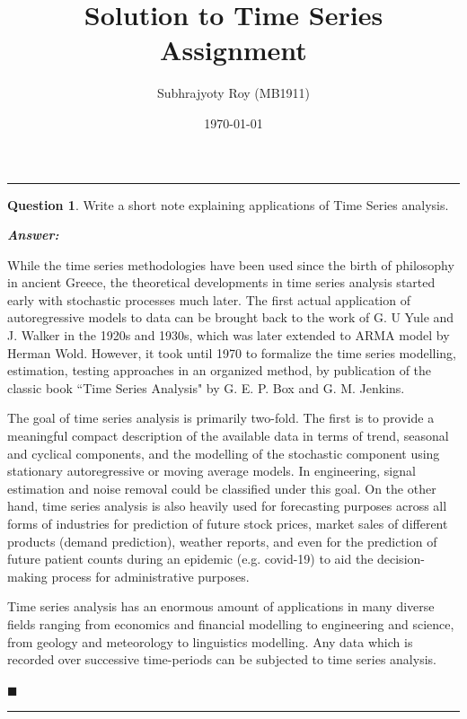 \documentclass[12pt]{article}
\title{Solution to Time Series Assignment}
\author{Subhrajyoty Roy (MB1911)}
\date{\today}
\theoremstyle{definition}
\newtheorem{question}{Question}
\newenvironment{answer}{
    \textbf{\textit{Answer:}} \qquad
}{\hfill $\blacksquare$ \\ \begin{center}
    \rule{0.6\linewidth}{0.5px}    
\end{center}
}
\begin{document}
\maketitle

\begin{center}
    \rule{0.8\textwidth}{1px} 
\end{center}
\vspace*{2em}

\begin{question}
    Write a short note explaining applications of Time Series analysis.
\end{question}

\begin{answer}
    While the time series methodologies have been used since the birth of philosophy in ancient Greece, the theoretical developments in time series analysis started early with stochastic processes much later. The first actual application of autoregressive models to data can be brought back to the work of G. U Yule and J. Walker in the 1920s and 1930s, which was later extended to ARMA model by Herman Wold. However, it took until 1970 to formalize the time series modelling, estimation, testing approaches in an organized method, by publication of the classic book ``Time Series Analysis" by G. E. P. Box and G. M. Jenkins. 

    The goal of time series analysis is primarily two-fold. The first is to provide a meaningful compact description of the available data in terms of trend, seasonal and cyclical components, and the modelling of the stochastic component using stationary autoregressive or moving average models. In engineering, signal estimation and noise removal could be classified under this goal. On the other hand, time series analysis is also heavily used for forecasting purposes across all forms of industries for prediction of future stock prices, market sales of different products (demand prediction), weather reports, and even for the prediction of future patient counts during an epidemic (e.g. covid-19) to aid the decision-making process for administrative purposes.

    Time series analysis has an enormous amount of applications in many diverse fields ranging from economics and financial modelling to engineering and science, from geology and meteorology to linguistics modelling. Any data which is recorded over successive time-periods can be subjected to time series analysis.


\end{answer}
\end{document}
